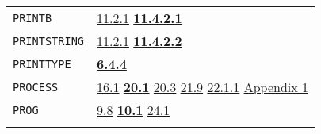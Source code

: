 \documentclass[a4paper,]{article}
\begin{document}
\begin{longtable}[]{@{}ll@{}}
\begin{minipage}[t]{0.24\columnwidth}\raggedright\strut
\texttt{PRINTB}\strut
\end{minipage} & \begin{minipage}[t]{0.70\columnwidth}\raggedright\strut
\href{11-input-output.md\#1121-open}{11.2.1} \textbf{\href{11-input-output.md\#11421-printb}{11.4.2.1}}\strut
\end{minipage}\tabularnewline
\begin{minipage}[t]{0.24\columnwidth}\raggedright\strut
\texttt{PRINTSTRING}\strut
\end{minipage} & \begin{minipage}[t]{0.70\columnwidth}\raggedright\strut
\href{11-input-output.md\#1121-open}{11.2.1} \textbf{\href{11-input-output.md\#11422-printstring}{11.4.2.2}}\strut
\end{minipage}\tabularnewline
\begin{minipage}[t]{0.24\columnwidth}\raggedright\strut
\texttt{PRINTTYPE}\strut
\end{minipage} & \begin{minipage}[t]{0.70\columnwidth}\raggedright\strut
\textbf{\href{06-data-types.md\#644-printtype-evaltype-and-applytype}{6.4.4}}\strut
\end{minipage}\tabularnewline
\begin{minipage}[t]{0.24\columnwidth}\raggedright\strut
\texttt{PROCESS}\strut
\end{minipage} & \begin{minipage}[t]{0.70\columnwidth}\raggedright\strut
\href{16-errors-frames-etc.md\#161-listen}{16.1} \textbf{\href{20-coroutines.md\#201-process-the-type}{20.1}}
\href{20-coroutines.md\#203-process-the-subr}{20.3} \href{21-interrupts.md\#219-user-defined-interrupts}{21.9}
\href{22-storage-management.md\#2211-stacks-and-other-internal-vectors}{22.1.1}
\href{appendix-1-a-look-inside.md\#basic-data-structures}{Appendix 1}\strut
\end{minipage}\tabularnewline
\begin{minipage}[t]{0.24\columnwidth}\raggedright\strut
\texttt{PROG}\strut
\end{minipage} & \begin{minipage}[t]{0.70\columnwidth}\raggedright\strut
\href{09-functions.md\#98-activation-name-act-again-and-return-1}{9.8}
\textbf{\href{10-looping.md\#101-prog-and-repeat-1}{10.1}}
\href{24-efficiency-and-tastefulness.md\#241-efficiency}{24.1}\strut
\end{minipage}\tabularnewline
\begin{minipage}[t]{0.24\columnwidth}\raggedright\strut

\end{minipage}
\end{longtable}
\end{document}
